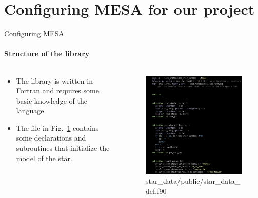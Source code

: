 \documentclass{beamer}
\begin{document}
\section{Configuring MESA for our project}
\begin{frame}{Configuring MESA}
    \framesubtitle{Structure of the library}
    \begin{columns}
        \begin{column}{0.5\textwidth}
            \begin{itemize}
                \item<1-> The library is written in Fortran and requires some basic knowledge of the language.
                \item<2-> The file in Fig.~\ref{fig:star_data_def} contains some declarations and subroutines that initialize the model of the star.
            \end{itemize}
        \end{column}
        \begin{column}{0.5\textwidth}
            \begin{center}
                \pause
                \begin{figure}
                    \centering
                    \includegraphics[width=\textwidth]{figs/star_data_def.png}
                    \caption{star\_data/public/star\_data\_def.f90}
                    \label{fig:star_data_def}
                \end{figure}
            \end{center}
        \end{column}
    \end{columns}      
\end{frame}
\end{document}
